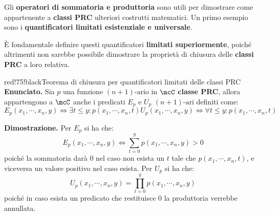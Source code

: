 Gli \textbf{operatori di sommatoria e produttoria} sono utili per dimostrare come appartenente a \textbf{classi PRC} ulteriori costrutti matematici.
Un primo esempio sono i \textbf{quantificatori limitati esistenziale e universale}.

\newpage


È fondamentale definire questi quantificatori \textbf{limitati superiormente}, poiché altrimenti non sarebbe possibile dimostrare la proprietà di chiusura delle \textbf{classi PRC} a loro relativa.

\begin{halfframedbox}{red!75!black}{Teorema di chiusura per quantificatori limitati delle classi PRC}\label{Teorema di chiusura per quantificatori limitati delle classi PRC}
  \textbf{Enunciato. } Sia \(p\) una funzione \((n+1)\text{-ario}\) in \(\mcC\) \textbf{classe PRC}, allora appartengono a \(\mcC\) anche i predicati \(E_p\) e \(U_p\) \((n+1)\text{-ari}\) definiti come:
  \begin{equation}
    E_p(x_1,\cdots,x_n,y)\iff \exists t \leq y: p(x_1,\cdots,x_n,t)
    U_p(x_1,\cdots,x_n,y)\iff \forall t \leq y: p(x_1,\cdots,x_n,t)
  \end{equation}

  \begin{center}
    \textcolor{red!75!black}{\hdashrule[0.5ex]{18cm}{1pt}{3mm 3pt 1mm 2pt}}
  \end{center}

  \textbf{Dimostrazione. }  Per \(E_p\) si ha che:
  \begin{equation}
    E_p(x_1,\cdots,x_n,y)\iff\sum_{t=0}^y p(x_1,\cdots,x_n,y)> 0
  \end{equation}
  poiché la sommatoria darà \(0\) nel caso non esista un \(t\) tale che \(p(x_1,\cdots,x_n,t)\), e viceversa un valore positivo nel caso esista.
  Per \(U_p\) si ha che:
  \begin{equation}
    U_p(x_1,\cdots,x_n,y)=\prod_{t=0}^y p(x_1,\cdots,x_n,y)
  \end{equation}
  poiché in caso esista un predicato che restituisce \(0\) la produttoria verrebbe annullata.
\end{halfframedbox}

